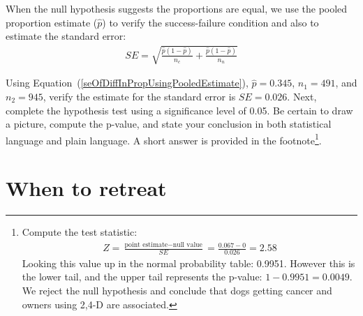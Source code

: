 \begin{tipBox}{
When the null hypothesis suggests the proportions are equal, we use the pooled proportion estimate ($\hat{p}$) to verify the success-failure condition and also to estimate the standard error:
\begin{eqnarray}
SE = \sqrt{\frac{\hat{p}(1-\hat{p})}{n_c} + \frac{\hat{p}(1-\hat{p})}{n_n}} 
\label{seOfDiffInPropUsingPooledEstimate}
\end{eqnarray}}
\end{tipBox}

\begin{exercise}\label{verifySEOfPooledEstimateOf24DWithCancerNoCancerDogs}
Using Equation~(\ref{seOfDiffInPropUsingPooledEstimate}), $\hat{p}=0.345$, $n_1 = 491$, and $n_2=945$, verify the estimate for the standard error is $SE = 0.026$. Next, complete the hypothesis test using a significance level of 0.05. Be certain to draw a picture, compute the p-value, and state your conclusion in both statistical language and plain language. A short answer is provided in the footnote\footnote{Compute the test statistic:
\begin{eqnarray*}
Z = \frac{\text{point estimate} - \text{null value}}{SE} = \frac{0.067 - 0}{0.026} = 2.58
\end{eqnarray*}
Looking this value up in the normal probability table: 0.9951. However this is the lower tail, and the upper tail represents the p-value: $1-0.9951 = 0.0049$. We reject the null hypothesis and conclude that dogs getting cancer and owners using 2,4-D are associated.}.
\end{exercise}



\section{When to retreat}

